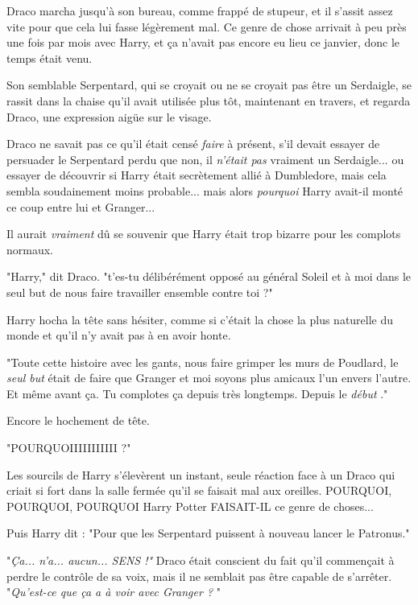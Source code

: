 Draco marcha jusqu'à son bureau, comme frappé de stupeur, et il s'assit assez vite pour que cela lui fasse légèrement mal. Ce genre de chose arrivait à peu près une fois par mois avec Harry, et ça n'avait pas encore eu lieu ce janvier, donc le temps était venu.

Son semblable Serpentard, qui se croyait ou ne se croyait pas être un Serdaigle, se rassit dans la chaise qu'il avait utilisée plus tôt, maintenant en travers, et regarda Draco, une expression aigüe sur le visage.

Draco ne savait pas ce qu'il était censé \emph{faire}  à présent, s'il devait essayer de persuader le Serpentard perdu que non, il \emph{n'était pas}  vraiment un Serdaigle... ou essayer de découvrir si Harry était secrètement allié à Dumbledore, mais cela sembla soudainement moins probable... mais alors \emph{pourquoi}  Harry avait-il monté ce coup entre lui et Granger...

Il aurait \emph{vraiment}  dû se souvenir que Harry était trop bizarre pour les complots normaux.

"Harry," dit Draco. "t'es-tu délibérément opposé au général Soleil et à moi dans le seul but de nous faire travailler ensemble contre toi ?"

Harry hocha la tête sans hésiter, comme si c'était la chose la plus naturelle du monde et qu'il n'y avait pas à en avoir honte.

"Toute cette histoire avec les gants, nous faire grimper les murs de Poudlard, le \emph{seul but}  était de faire que Granger et moi soyons plus amicaux l'un envers l'autre. Et même avant ça. Tu complotes ça depuis très longtemps. Depuis le \emph{début} ."

Encore le hochement de tête.

"POURQUOIIIIIIIIIII ?"

Les sourcils de Harry s'élevèrent un instant, seule réaction face à un Draco qui criait si fort dans la salle fermée qu'il se faisait mal aux oreilles. POURQUOI, POURQUOI, POURQUOI Harry Potter FAISAIT-IL ce genre de choses...

Puis Harry dit : "Pour que les Serpentard puissent à nouveau lancer le Patronus."

"\emph{Ça... n'a... aucun... SENS !"}  Draco était conscient du fait qu'il commençait à perdre le contrôle de sa voix, mais il ne semblait pas être capable de s'arrêter. "\emph{Qu'est-ce que ça a à voir avec Granger ?} "

